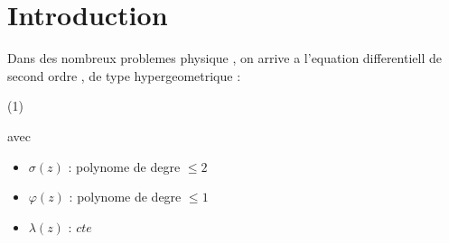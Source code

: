 \documentclass[12pt]{book}
\begin{document}
        \section{Introduction}
            Dans des nombreux problemes physique , on arrive a l'equation differentiell de second ordre , de type hypergeometrique : 
            \begin{center}
                 (1)
            \end{center}
            avec \begin{itemize}
                \item $\sigma(z)$ : polynome de degre $\leq 2$
                \item $\varphi(z)$ : polynome de degre $\leq 1$
                \item $\lambda(z)$ : $cte$
            \end{itemize}
\end{document}
